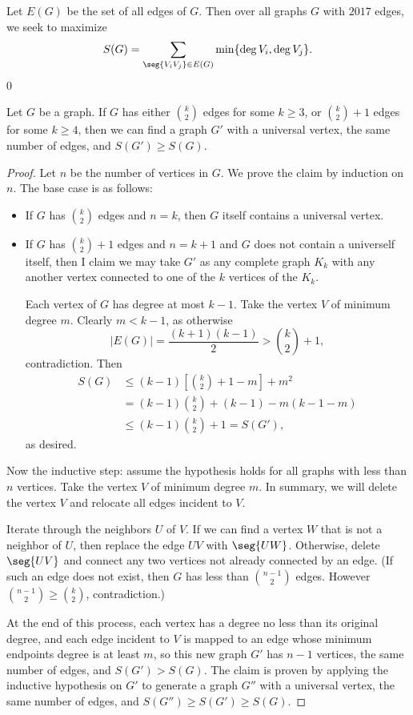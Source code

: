 Let $E(G)$ be the set of all edges of $G$. Then over all graphs $G$ with $2017$ edges, we seek to maximize \[S(G)=\sum_{\seg{V_iV_j}\in E(G)}\min\{\deg V_i,\deg V_j\}.\]
\setcounter{iclaim}0
\begin{iclaim}
    Let $G$ be a graph. If $G$ has either $\binom k2$ edges for some $k\ge3$, or $\binom k2+1$ edges for some $k\ge4$, then we can find a graph $G'$ with a universal vertex, the same number of edges, and $S(G')\ge S(G)$.
\end{iclaim}
\begin{proof}
    Let $n$ be the number of vertices in $G$. We prove the claim by induction on $n$. The base case is as follows:
    \begin{itemize}
        \item If $G$ has $\binom k2$ edges and $n=k$, then $G$ itself contains a universal vertex.
        \item If $G$ has $\binom k2+1$ edges and $n=k+1$ and $G$ does not contain a univerself itself, then I claim we may take $G'$ as any complete graph $K_k$ with any another vertex connected to one of the $k$ vertices of the $K_k$.

            Each vertex of $G$ has degree at most $k-1$. Take the vertex $V$ of minimum degree $m$. Clearly $m<k-1$, as otherwise \[|E(G)|=\frac{(k+1)(k-1)}2>\binom k2+1,\]
            contradiction. Then
            \begin{align*}
                S(G)&\le(k-1)\left[\binom k2+1-m\right]+m^2\\
                &=(k-1)\binom k2+(k-1)-m(k-1-m)\\
                &\le(k-1)\binom k2+1=S(G'),
            \end{align*}
            as desired.
    \end{itemize}
    Now the inductive step: assume the hypothesis holds for all graphs with less than $n$ vertices. Take the vertex $V$ of minimum degree $m$. In summary, we will delete the vertex $V$ and relocate all edges incident to $V$.

    Iterate through the neighbors $U$ of $V$. If we can find a vertex $W$ that is not a neighbor of $U$, then replace the edge $UV$ with $\seg{UW}$. Otherwise, delete $\seg{UV}$ and connect any two vertices not already connected by an edge. (If such an edge does not exist, then $G$ has less than $\binom{n-1}2$ edges. However $\binom{n-1}2\ge\binom k2$, contradiction.)

    At the end of this process, each vertex has a degree no less than its original degree, and each edge incident to $V$ is mapped to an edge whose minimum endpoints degree is at least $m$, so this new graph $G'$ has $n-1$ vertices, the same number of edges, and $S(G')>S(G)$. The claim is proven by applying the inductive hypothesis on $G'$ to generate a graph $G''$ with a universal vertex, the same number of edges, and $S(G'')\ge S(G')\ge S(G)$.
\end{proof}

